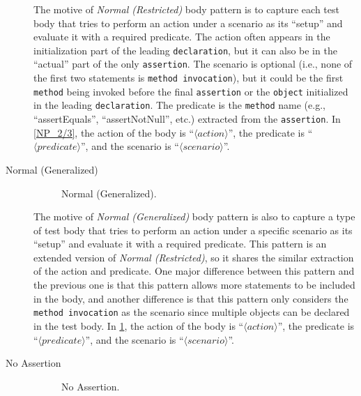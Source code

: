 \begin{description}
The motive of \textit{Normal (Restricted)} body pattern is to capture each test body that tries to perform an action under a scenario as its \enquote{setup} and evaluate it with a required predicate.
%
The action often appears in the initialization part of the leading \texttt{declaration}, but it can also be in the \enquote{actual} part of the only \texttt{assertion}.
%
The scenario is optional (i.e., none of the first two statements is \texttt{method invocation}), but it could be the first \texttt{method} being invoked before the final \texttt{assertion} or the \texttt{object} initialized in the leading \texttt{declaration}.
%
The predicate is the \texttt{method} name (e.g., \enquote{assertEquals}, \enquote{assertNotNull}, etc.) extracted from the \texttt{assertion}.
%
In \cref{NP_2/3}, the action of the body is \enquote{$\langle action \rangle$}, the predicate is \enquote{$\langle predicate \rangle$}, and the scenario is \enquote{$\langle scenario \rangle$}.


\item[Normal (Generalized)] 

\begin{figure}[htbp]
\centering
    \begin{subfigure}{0.675\textwidth}
    \end{subfigure}
\caption{Normal (Generalized).}
\label{NP_any}
\end{figure}

The motive of \textit{Normal (Generalized)} body pattern is also to capture a type of test body that tries to perform an action under a specific scenario as its \enquote{setup} and evaluate it with a required predicate.
%
This pattern is an extended version of \textit{Normal (Restricted)}, so it shares the similar extraction of the action and predicate.
%
One major difference between this pattern and the previous one is that this pattern allows more statements to be included in the body, and another difference is that this pattern only considers the \texttt{method invocation} as the scenario since multiple objects can be declared in the test body.
%
In \cref{NP_any}, the action of the body is \enquote{$\langle action \rangle$}, the predicate is \enquote{$\langle predicate \rangle$}, and the scenario is \enquote{$\langle scenario \rangle$}.


\item[No Assertion] 

\begin{figure}[htbp]
\centering
    \begin{subfigure}{0.7\textwidth}
    \end{subfigure}
\caption{No Assertion.}
\label{NoAstP}
\end{figure}


\end{description}
